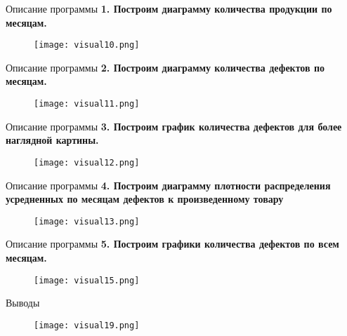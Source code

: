 \documentclass{beamer}
\begin{document}
\begin{frame}{Описание программы}
\textbf{1. Построим диаграмму количества продукции по месяцам.}
\begin{figure}[h]
\centering
\texttt{[image: visual10.png]}
\label{fig:mpr}
\end{figure}
\end{frame}

\begin{frame}{Описание программы}
\textbf{2. Построим диаграмму количества дефектов по месяцам.}
\begin{figure}[h]
\centering
\texttt{[image: visual11.png]}
\label{fig:mpr}
\end{figure}
\end{frame}


\begin{frame}{Описание программы}
\textbf{3. Построим график количества дефектов для более наглядной картины.}
\begin{figure}[h]
\centering
\texttt{[image: visual12.png]}
\label{fig:mpr}
\end{figure}
\end{frame}

\begin{frame}{Описание программы}
\textbf{4. Построим диаграмму плотности распределения усредненных по месяцам дефектов к произведенному товару}
\begin{figure}[h]
\centering
\texttt{[image: visual13.png]}
\label{fig:mpr}
\end{figure}
\end{frame}

\begin{frame}{Описание программы}
\textbf{5. Построим графики количества дефектов по всем месяцам.}
\begin{figure}[h]
\centering
\texttt{[image: visual15.png]}
\label{fig:mpr}
\end{figure}
\end{frame}

\begin{frame}{Выводы}
\begin{figure}[h]
\centering
\texttt{[image: visual19.png]}
\label{fig:mpr}
\end{figure}
\end{frame}
\end{document}

